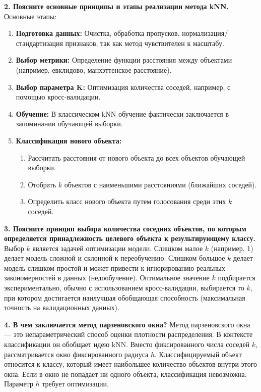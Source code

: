 \textbf{2. Поясните основные принципы и этапы реализации метода kNN.}
Основные этапы:
\begin{enumerate}
    \item \textbf{Подготовка данных:} Очистка, обработка пропусков, нормализация/стандартизация признаков, так как метод чувствителен к масштабу.
    \item \textbf{Выбор метрики:} Определение функции расстояния между объектами (например, евклидово, манхэттенское расстояние).
    \item \textbf{Выбор параметра K:} Оптимизация количества соседей, например, с помощью кросс-валидации.
    \item \textbf{Обучение:} В классическом kNN обучение фактически заключается в запоминании обучающей выборки.
    \item \textbf{Классификация нового объекта:}
    \begin{enumerate}
        \item Рассчитать расстояния от нового объекта до всех объектов обучающей выборки.
        \item Отобрать \(k\) объектов с наименьшими расстояниями (ближайших соседей).
        \item Определить класс нового объекта путем голосования среди этих \(k\) соседей.
    \end{enumerate}
\end{enumerate}

\textbf{3. Поясните принцип выбора количества соседних объектов, по которым определяется принадлежность целевого объекта к результирующему классу.}
Выбор \(k\) является задачей оптимизации модели. Слишком малое \(k\) (например, 1) делает модель сложной и склонной к переобучению. Слишком большое \(k\) делает модель слишком простой и может привести к игнорированию реальных закономерностей в данных (недообучение). Оптимальное значение \(k\) подбирается экспериментально, обычно с использованием кросс-валидации, выбирается то \(k\), при котором достигается наилучшая обобщающая способность (максимальная точность на валидационных данных).

\textbf{4. В чем заключается метод парзеновского окна?}
Метод парзеновского окна — это непараметрический способ оценки плотности распределения. В контексте классификации он обобщает идею kNN. Вместо фиксированного числа соседей \(k\), рассматривается окно фиксированного радиуса \(h\). Классифицируемый объект относится к классу, который имеет наибольшее количество объектов внутри этого окна. Если в окно не попадает ни одного объекта, классификация невозможна. Параметр \(h\) требует оптимизации.

